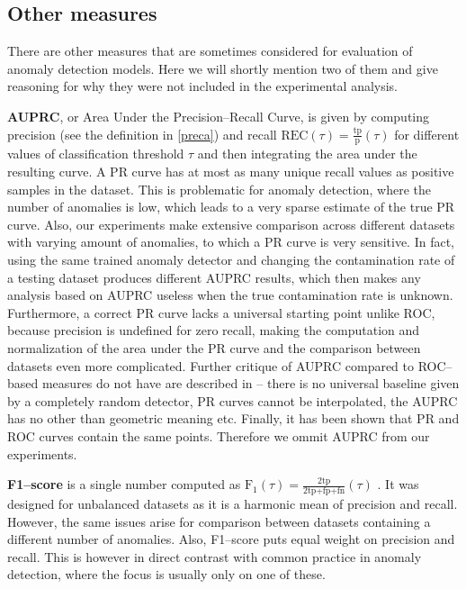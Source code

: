 \subsection{Other measures}
There are other measures that are sometimes considered for evaluation of anomaly detection models. Here we will shortly mention two of them and give reasoning for why they were not included in the experimental analysis.

\textbf{AUPRC}, or Area Under the Precision--Recall Curve, is given by computing precision (see the definition in \ref{preca}) and recall $\text{REC}(\tau) = \frac{\text{tp}}{\text{p}}(\tau)$ for different values of classification threshold $\tau$ and then integrating the area under the resulting curve. A PR curve has at most as many unique recall values as positive samples in the dataset. This is problematic for anomaly detection, where the number of anomalies is low, which leads to a very sparse estimate of the true PR curve. Also, our experiments make extensive comparison across different datasets with varying amount of anomalies, to which a PR curve is very sensitive. In fact, using the same trained anomaly detector and changing the contamination rate of a testing dataset produces different AUPRC results, which then makes any analysis based on AUPRC useless when the true contamination rate is unknown. Furthermore, a correct PR curve lacks a universal starting point unlike ROC, because precision is undefined for zero recall, making the computation and normalization of the area under the PR curve and the comparison between datasets even more complicated. Further critique of AUPRC compared to ROC--based measures do not have are described in \cite{flach2015precision} -- there is no universal baseline given by a completely random detector, PR curves cannot be interpolated, the AUPRC has no other than geometric meaning etc. Finally, it has been shown \cite{davis2006relationship} that PR and ROC curves contain the same points. Therefore we ommit AUPRC from our experiments.


\textbf{F1--score} is a single number computed as $\text{F}_1(\tau) = \frac{\text{2tp}}{\text{2tp+fp+fn}}(\tau)$ \cite{chinchor1992muc}. It was designed for unbalanced datasets as it is a harmonic mean of precision and recall. However, the same issues arise for comparison between datasets containing a different number of anomalies. Also, F1--score puts equal weight on precision and recall. This is however in direct contrast with common practice in anomaly detection, where the focus is usually only on one of these.

